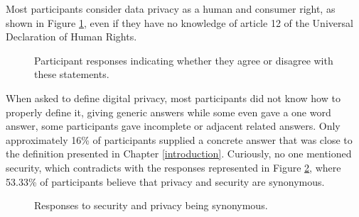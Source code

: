 Most participants consider data privacy as a human and consumer right,
as shown in Figure \ref{fig:privacy_human_right_histogram}, even if they have
no knowledge of article 12 of the Universal Declaration of Human Rights.

\begin{figure}[H]
    \begin{center}
        \caption{Participant responses indicating whether they agree or disagree with these statements.}
        \label{fig:privacy_human_right_histogram}
    \end{center}
\end{figure}

When asked to define digital privacy, most participants did not know
how to properly define it, giving generic answers while some even gave a one word answer,
some participants gave incomplete or adjacent related answers. Only approximately
16\% of participants supplied a concrete answer that was close to the definition
presented in Chapter \ref{introduction}. Curiously, no one mentioned security,
which contradicts with the responses represented in Figure \ref{fig:security_equals_privacy},
where 53.33\% of participants believe that privacy and security are synonymous.

\begin{figure}[H]
    \centering
    \caption{Responses to security and privacy being synonymous.}
    \label{fig:security_equals_privacy}
\end{figure}

